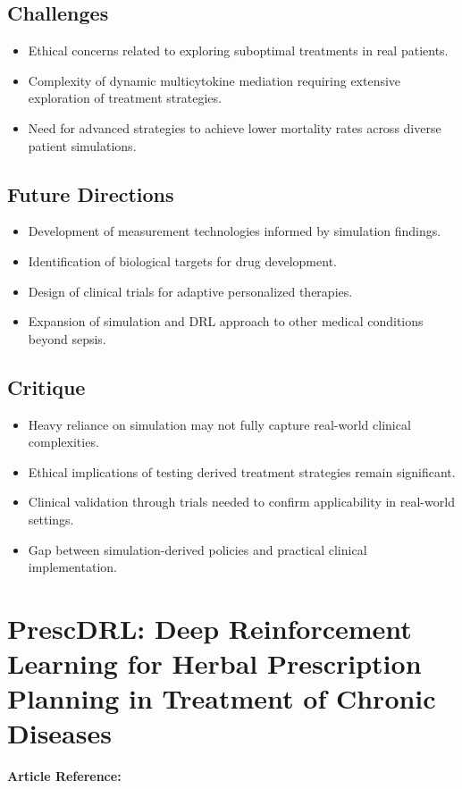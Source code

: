\subsection*{Challenges}
\begin{itemize}
    \item Ethical concerns related to exploring suboptimal treatments in real patients.
    \item Complexity of dynamic multicytokine mediation requiring extensive exploration of treatment strategies.
    \item Need for advanced strategies to achieve lower mortality rates across diverse patient simulations.
\end{itemize}

\subsection*{Future Directions}
\begin{itemize}
    \item Development of measurement technologies informed by simulation findings.
    \item Identification of biological targets for drug development.
    \item Design of clinical trials for adaptive personalized therapies.
    \item Expansion of simulation and DRL approach to other medical conditions beyond sepsis.
\end{itemize}

\subsection*{Critique}
\begin{itemize}
    \item Heavy reliance on simulation may not fully capture real-world clinical complexities.
    \item Ethical implications of testing derived treatment strategies remain significant.
    \item Clinical validation through trials needed to confirm applicability in real-world settings.
    \item Gap between simulation-derived policies and practical clinical implementation.
\end{itemize}

\section{PrescDRL: Deep Reinforcement Learning for Herbal Prescription Planning in Treatment of Chronic Diseases}
\textbf{Article Reference:} \cite{yangPrescDRLDeepReinforcement2024}

